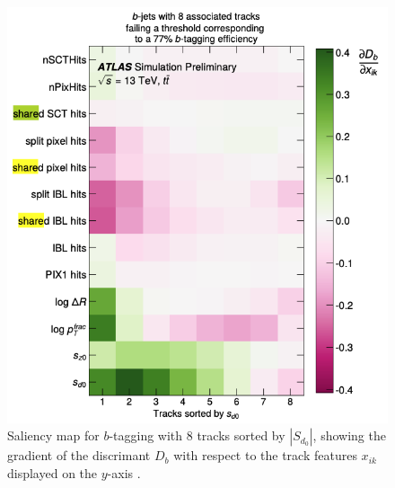 \begin{figure}[h!]
  \center
  \begin{minipage}[c]{0.7\textwidth}
    \includegraphics[width=\textwidth]{Images/FTAG/dipsSaliency.png}
  \end{minipage}
  \begin{minipage}[c]{0.25\textwidth}
    \caption{Saliency map for $b$-tagging with 8 tracks sorted by $|S_{d_0}|$, showing the gradient of the discrimant $D_b$ with respect to the track features $x_{ik}$ displayed on the $y$-axis \cite{ATL-PHYS-PUB-2020-014}.} 
  \label{fig:dipsSaliency}
  \end{minipage}
\end{figure}

